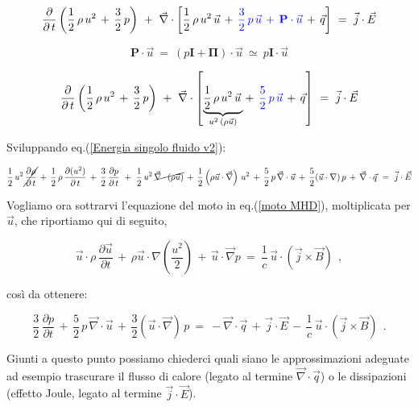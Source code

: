 \[ \frac{\partial}{\partial\, t} \left(\frac{1}{2}\,\rho\, u^2\, +\, \frac{3}{2}\, p\right)\ + \ \vec\nabla\cdot\left[\frac{1}{2}\,\rho\, u^2\,\vec u\, +\, \color{blue}\frac{3}{2}\, p\, \vec u\, +\, \mathbf{P}\cdot\vec u\, \color{black} +\, \vec q \right]  \ =\ \vec j\cdot \vec E \]

\[ \mathbf{P}\cdot \vec u\ =\ \left( p\mathbf{I} + \mathbf{\Pi} \right)\cdot \vec u \ \simeq\ p\mathbf{I}\cdot \vec u \]

\begin{equation}
	\label{Energia singolo fluido v2}
	\frac{\partial}{\partial\, t} \left(\frac{1}{2}\,\rho\, u^2\, +\, \frac{3}{2}\, p\right)\ + \ \vec\nabla\cdot\left[  \underset{u^2\,(\rho\vec u)}{\underbrace{\frac{1}{2}\,\rho\, u^2\,\vec u\,}} +\, \color{blue}\frac{5}{2}\, p\, \vec u\,\color{black} +\, \vec q \right]  \ =\ \vec j\cdot \vec E
\end{equation}

Sviluppando eq.(\ref{Energia singolo fluido v2}):

\[ \frac{1}{2}\, u^2\,\cancel{\frac{\partial \rho}{\partial\, t}}\, +\, \frac{1}{2}\, \rho\,\frac{\partial (u^2)}{\partial\, t}\, +\,  \frac{3}{2}\, \frac{\partial p}{\partial\, t}\ + \ 
\frac{1}{2}\, u^2\, \cancel{\vec\nabla\cdot(\rho\vec u)}\, + \, \frac{1}{2} \left(\rho\vec u\cdot \vec \nabla\right)\, u^2\, +\, \frac{5}{2}\, p\, \vec\nabla\cdot \vec u\, +\, \frac{5}{2} (\vec u\cdot \nabla)\, p \, +\, \vec\nabla\cdot\vec q \ =\ \vec j\cdot \vec E \]



Vogliamo ora sottrarvi l'equazione del moto in eq.(\ref{moto MHD}), moltiplicata per $\vec u$, che riportiamo qui di seguito,

\[ \vec u\cdot \rho\, \frac{\partial \vec u}{\partial t}\, +\, \rho\vec u\cdot \nabla \left(\frac{u^2}{2}\right) \,+\, \vec u\cdot\vec\nabla p\ =\ \frac{1}{c}\,\vec u\cdot \left(\vec j\times \vec B \right)\ \ , \]

così da ottenere:

\[ \frac{3}{2}\, \frac{\partial p}{\partial t}\, +\, \frac{5}{2}\, p\, \vec \nabla\cdot\vec u\, +\, \frac{3}{2}\left(\vec u\cdot \vec \nabla\right)\, p
\ =\ -\vec\nabla\cdot\vec q \, +\, \vec j\cdot \vec E\, -\, \frac{1}{c}\,\vec u\cdot \left(\vec j\times \vec B \right)\ \ .\]

Giunti a questo punto possiamo chiederci quali siano le approssimazioni adeguate ad esempio trascurare il flusso di calore (legato al termine $\vec\nabla\cdot\vec q$) o le dissipazioni (effetto Joule, legato al termine $\vec j\cdot \vec E$).

